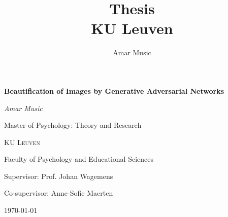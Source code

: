 \documentclass[12pt, a4paper]{article}
\title{
	{Thesis}\\
	{\large KU Leuven}
}
\author{Amar Music}
\begin{document}
	\begin{titlepage}
		\centering
		{\huge\bfseries Beautification of Images by Generative Adversarial Networks\par}
		\vspace{1cm}
		{\Large\itshape Amar Music\par}
		Master of Psychology: Theory and Research\par
		\vspace{0.5cm}
		{\scshape\large KU Leuven\par}
		Faculty of Psychology and Educational Sciences\par

		\vfill
		\large Supervisor: Prof. Johan Wagemens\par
		\large Co-supervisor: Anne-Sofie Maerten\par
		{\large \today\par}
	\end{titlepage}
	
	
	
	\pagebreak
	
	\tableofcontents
	\pagebreak
	
	

	
	
	
	
	
	
	
	\pagebreak
	
	\printbibliography
	\pagebreak
	
	
	
\end{document}
